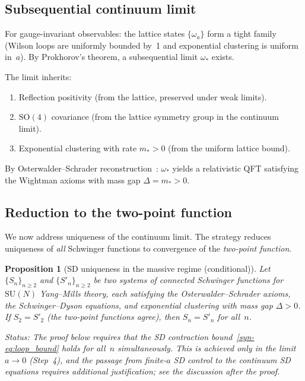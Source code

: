 \documentclass[11pt]{article}
\newtheorem{proposition}[theorem]{Proposition}
\theoremstyle{definition}
\newcommand{\SU}{\mathrm{SU}}
\newcommand{\SO}{\mathrm{SO}}
\begin{document}
\subsection{Subsequential continuum limit}

For gauge-invariant observables: the lattice states
$\{\omega_a\}$ form a tight family (Wilson loops are
uniformly bounded by~1 and exponential clustering is
uniform in~$a$).  By Prokhorov's theorem, a
subsequential limit $\omega_*$ exists.

The limit inherits:
\begin{enumerate}[label=(\roman*),nosep]
  \item Reflection positivity (from the lattice, preserved
    under weak limits).
  \item $\SO(4)$ covariance (from the lattice symmetry
    group in the continuum limit).
  \item Exponential clustering with rate $m_* > 0$
    (from the uniform lattice bound).
\end{enumerate}
By Osterwalder--Schrader
reconstruction~\cite{OsterwalderSchrader}:
$\omega_*$ yields a relativistic QFT satisfying
the Wightman axioms with mass gap $\Delta = m_* > 0$.

\subsection{Reduction to the two-point function}

We now address uniqueness of the continuum limit.  The
strategy reduces uniqueness of \emph{all} Schwinger
functions to convergence of the \emph{two-point function}.

\begin{proposition}[SD uniqueness in the massive regime
(conditional)]
\label{syn-prop:sd_unique}
Let $\{S_n\}_{n \geq 2}$ and $\{S'_n\}_{n \geq 2}$ be
two systems of connected Schwinger functions for $\SU(N)$
Yang--Mills theory, each satisfying the
Osterwalder--Schrader axioms, the Schwinger--Dyson equations,
and exponential clustering with mass gap $\Delta > 0$.
If $S_2 = S'_2$
\textup{(}the two-point functions agree\textup{)},
then $S_n = S'_n$ for all~$n$.

\emph{Status:} The proof below requires that the
SD contraction bound~\eqref{syn-eq:loop_bound}
holds for all~$n$ simultaneously.  This is achieved
only in the limit $a\to 0$ (Step~4), and the passage
from finite-$a$ SD control to the continuum SD equations
requires additional justification; see the discussion
after the proof.
\end{proposition}
\end{document}
